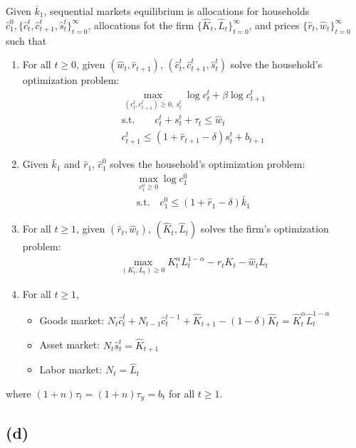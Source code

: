 \documentclass{ltjsarticle}
\begin{document}
Given $\bar{k}_1$, sequential markets equilibrium is allocations for households $\hat{c}_1^0, \{\hat{c}_t^t, \hat{c}_{t+1}^t, \hat{s}_t^t \}_{t=0}^{\infty}$, allocations fot the firm $\{\hat{K}_t, \hat{L}_t\}_{t=0}^{\infty}$, and prices $\{\hat{r}_t, \hat{w}_t\}_{t=0}^{\infty}$ such that
\begin{enumerate}
  \item For all $t \geq 0$, given $(\hat{w}_t, \hat{r}_{t+1})$, $(\hat{c}_t^t, \hat{c}_{t+1}^t, \hat{s}_t^t)$ solve the household's optimization problem:
  \begin{gather*}
    \max_{(c_t^t, c_{t+1}^t) \geq 0, \: s_t^t} \log c_t^t + \beta \log c_{t+1}^t \\
    \text{s.t.} \qquad c_t^t + s_t^t + \tau_t \leq \hat{w}_t \\
    c_{t+1}^t \leq (1 + \hat{r}_{t+1} - \delta) s_t^t + b_{t+1}
  \end{gather*}
  \item Given $\bar{k}_1$ and $\hat{r}_1$, $\hat{c}_1^0$ solves the household's optimization problem:
  \begin{gather*}
    \max_{c_1^0 \geq 0} \log c_1^0 \\
    \text{s.t.} \quad c_1^0 \leq (1 + \hat{r}_1 - \delta) \bar{k}_1
  \end{gather*}
  \item For all $t \geq 1$, given $(\hat{r}_t, \hat{w}_t)$, $(\hat{K}_t, \hat{L}_t)$ solves the firm's optimization problem:
  \begin{gather*}
    \max_{(K_t, L_t) \geq 0} K_t^\alpha L_t^{1-\alpha} - \hat{r}_t K_t - \hat{w}_t L_t
  \end{gather*}
  \item For all $t \geq 1$,
  \begin{itemize}
    \item Goods market: $N_t \hat{c}_t^t + N_{t-1} \hat{c}_t^{t-1} + \hat{K}_{t+1} - (1-\delta) \hat{K}_t  = \hat{K}_t^\alpha \hat{L}_t^{1-\alpha}$
    \item Asset market: $N_t \hat{s}_t^t = \hat{K}_{t+1}$
    \item Labor market: $N_t = \hat{L}_t$
  \end{itemize}
\end{enumerate}
where $(1+n)\tau_t = (1+n)\tau_y =b_t$ for all $t \geq 1$.

\subsection*{(d)}
\end{document}

